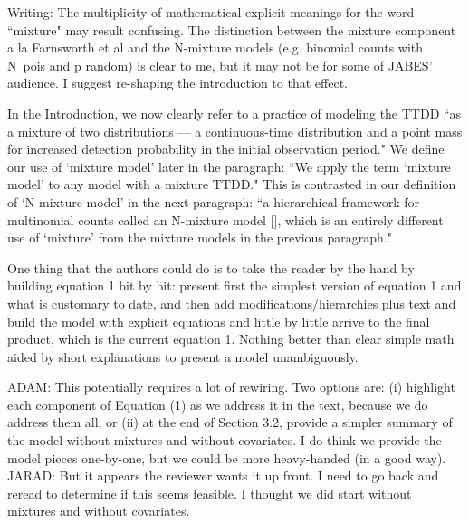 \documentclass[12pt]{article}
\renewenvironment{quote}  %
              {\list{}{\rightmargin\leftmargin}\normalfont%
               \item\relax}
              {\endlist}
\newcommand{\adam}[1]{{\color{blue} ADAM: #1}}
\newcommand{\jarad}[1]{{\color{Orange} JARAD: #1}}
\begin{document}
Writing: The multiplicity of mathematical explicit meanings for the word ``mixture" may result confusing. The distinction between the mixture component a la Farnsworth et al and the N-mixture models (e.g. binomial counts with N~pois and p random) is clear to me, but it may not be for some of JABES' audience.  I suggest re-shaping the introduction to that effect. 
\begin{quote}
In the Introduction, we now clearly refer to a practice of modeling the TTDD ``as a mixture of two distributions --- a continuous-time distribution and a point mass for increased detection probability in the initial observation period."
We define our use of `mixture model' later in the paragraph:  ``We apply the term `mixture model' to any model with a mixture TTDD."
This is contrasted in our definition of `N-mixture model' in the next paragraph: ``a hierarchical framework for multinomial counts called an N-mixture model [\dotso], which is an entirely different use of `mixture' from the mixture models in the previous paragraph."
\end{quote}

One thing that the authors could do is to take the reader by the hand by building equation 1 bit by bit: present first the simplest version of equation 1 and what is customary to date, and then add modifications/hierarchies plus text and build the model with explicit equations and little by little arrive to the final product, which is the current equation 1. Nothing better than clear simple math aided by short explanations to present a model unambiguously.
\begin{quote}
\adam{
This potentially requires a lot of rewiring.  Two options are: (i) highlight each component of Equation (1) as we address it in the text, because we do address them all, or (ii) at the end of Section 3.2, provide a simpler summary of the model without mixtures and without covariates.
I do think we provide the model pieces one-by-one, but we could be more heavy-handed (in a good way).
}
\jarad{But it appears the reviewer wants it up front. 
I need to go back and reread to determine if this seems feasible. 
I thought we did start without mixtures and without covariates.}
\end{quote}
\end{document}
